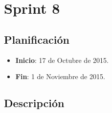 \section{Sprint 8} %

\subsection{Planificación}
\begin{itemize}
    \item \textbf{Inicio}: 17 de Octubre de 2015.
    \item \textbf{Fin}: 1 de Noviembre de 2015.
\end{itemize}


\subsection{Descripción}

